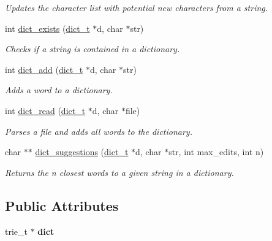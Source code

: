 \begin{DoxyCompactItemize}
\begin{DoxyCompactList}\small\item\em Updates the character list with potential new characters from a string. \end{DoxyCompactList}\item 
int \mbox{\hyperlink{structdict__t_ada2e9cd98e98ccefe871124833a4cd77}{dict\+\_\+exists}} (\mbox{\hyperlink{structdict__t}{dict\+\_\+t}} $\ast$d, char $\ast$str)
\begin{DoxyCompactList}\small\item\em Checks if a string is contained in a dictionary. \end{DoxyCompactList}\item 
int \mbox{\hyperlink{structdict__t_ab4825a90819a79433cd1f4f6034b4fc1}{dict\+\_\+add}} (\mbox{\hyperlink{structdict__t}{dict\+\_\+t}} $\ast$d, char $\ast$str)
\begin{DoxyCompactList}\small\item\em Adds a word to a dictionary. \end{DoxyCompactList}\item 
int \mbox{\hyperlink{structdict__t_a4a2d3fd1ef3eba7b6e70d87129ad347f}{dict\+\_\+read}} (\mbox{\hyperlink{structdict__t}{dict\+\_\+t}} $\ast$d, char $\ast$file)
\begin{DoxyCompactList}\small\item\em Parses a file and adds all words to the dictionary. \end{DoxyCompactList}\item 
char $\ast$$\ast$ \mbox{\hyperlink{structdict__t_af7a2a46644a6279d42ddda31bfde70e2}{dict\+\_\+suggestions}} (\mbox{\hyperlink{structdict__t}{dict\+\_\+t}} $\ast$d, char $\ast$str, int max\+\_\+edits, int n)
\begin{DoxyCompactList}\small\item\em Returns the n closest words to a given string in a dictionary. \end{DoxyCompactList}\end{DoxyCompactItemize}
\subsection*{Public Attributes}
\begin{DoxyCompactItemize}
\item 
\mbox{\label{structdict__t_a4743f4cde2360543d7976d68e0bfacee}} 
trie\+\_\+t $\ast$ {\bfseries dict}
\end{DoxyCompactItemize}


